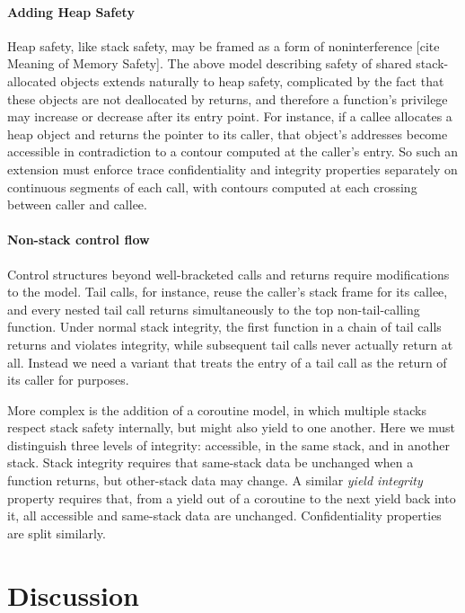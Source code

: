 \documentclass[acmsmall,review,anonymous]{acmart}\settopmatter{printfolios=true,printccs=false,printacmref=false}
\begin{document}
{  \paragraph{Adding Heap Safety}

    Heap safety, like stack safety, may be framed as a form of noninterference
    [cite Meaning of Memory Safety]. The above model describing safety of
    shared stack-allocated objects extends naturally to heap safety,
    complicated by the fact that these objects are not deallocated by returns,
    and therefore a function's privilege may increase or decrease after its
    entry point. For instance, if a callee allocates a heap object and returns
    the pointer to its caller, that object's addresses become accessible in
    contradiction to a contour computed at the caller's entry. So such an
    extension must enforce trace confidentiality and integrity properties
    separately on continuous segments of each call, with contours computed at
    each crossing between caller and callee.

  \paragraph{Non-stack control flow}

    Control structures beyond well-bracketed calls and returns require
    modifications to the model. Tail calls, for instance, reuse the caller's
    stack frame for its callee, and every nested tail call returns
    simultaneously to the top non-tail-calling function. Under normal stack
    integrity, the first function in a chain of tail calls returns and violates
    integrity, while subsequent tail calls never actually return at all.
    Instead we need a variant that treats the entry of a tail call as the
    return of its caller for purposes.

    More complex is the addition of a coroutine model, in which multiple stacks
    respect stack safety internally, but might also yield to one another.
    Here we must distinguish three levels of integrity: accessible, in the same
    stack, and in another stack. Stack integrity requires that same-stack data
    be unchanged when a function returns, but other-stack data may change. A
    similar {\em yield integrity} property requires that, from a yield out of
    a coroutine to the next yield back into it, all accessible and same-stack
    data are unchanged. Confidentiality properties are split similarly.

\section{Discussion}

}
\end{document}
